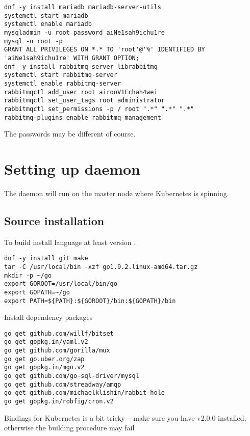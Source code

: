 \begin{lstlisting}
dnf -y install mariadb mariadb-server-utils
systemctl start mariadb
systemctl enable mariadb
mysqladmin -u root password aiNe1sah9ichu1re
mysql -u root -p
GRANT ALL PRIVILEGES ON *.* TO 'root'@'%' IDENTIFIED BY 'aiNe1sah9ichu1re' WITH GRANT OPTION;
dnf -y install rabbitmq-server librabbitmq
systemctl start rabbitmq-server
systemctl enable rabbitmq-server
rabbitmqctl add_user root airooV1Echah4wei
rabbitmqctl set_user_tags root administrator
rabbitmqctl set_permissions -p / root ".*" ".*" ".*"
rabbitmq-plugins enable rabbitmq_management
\end{lstlisting}

The passwords may be different of course.

\section{Setting up  daemon}
\label{sec:setup-swifty}

The  daemon will run on the master node
where Kubernetes is spinning.

\subsection{Source installation}
\label{subsec:setup-swifty-src}

To build  install 
language at least version
.

\begin{lstlisting}
dnf -y install git make
tar -C /usr/local/bin -xzf go1.9.2.linux-amd64.tar.gz
mkdir -p ~/go
export GOROOT=/usr/local/bin/go
export GOPATH=~/go
export PATH=${PATH}:${GOROOT}/bin:${GOPATH}/bin
\end{lstlisting}

Install dependency packages

\begin{lstlisting}
go get github.com/willf/bitset
go get gopkg.in/yaml.v2
go get github.com/gorilla/mux
go get go.uber.org/zap
go get gopkg.in/mgo.v2
go get github.com/go-sql-driver/mysql
go get github.com/streadway/amqp
go get github.com/michaelklishin/rabbit-hole
go get gopkg.in/robfig/cron.v2
\end{lstlisting}

Bindings for Kubernetes is a bit tricky -- make sure you have v2.0.0 installed,
otherwise the building procedure may fail

